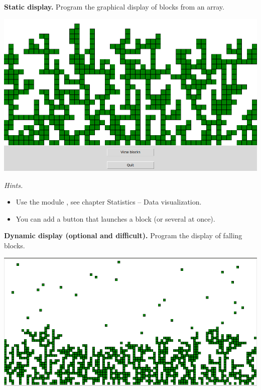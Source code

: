 \documentclass[11pt,class=report,crop=false]{standalone}
\begin{document}
\begin{activite}


\textbf{Static display.} Program the graphical display of blocks from an array.

\begin{center}
\includegraphics[scale=\myscale,scale=0.3]{screen-blocks-bloc1-en}
\end{center}
\medskip

\emph{Hints.}
\begin{itemize}
  \item Use the module , see chapter \og{}Statistics -- Data visualization\fg{}.
  \item You can add a button that launches a block (or several at once). 
\end{itemize}

\medskip



\textbf{Dynamic display (optional and difficult).} Program the display of falling blocks.
\medskip

\begin{center}
\includegraphics[scale=\myscale,scale=0.3]{screen-blocks-bloc2}
\end{center}


\end{activite}
\end{document}
